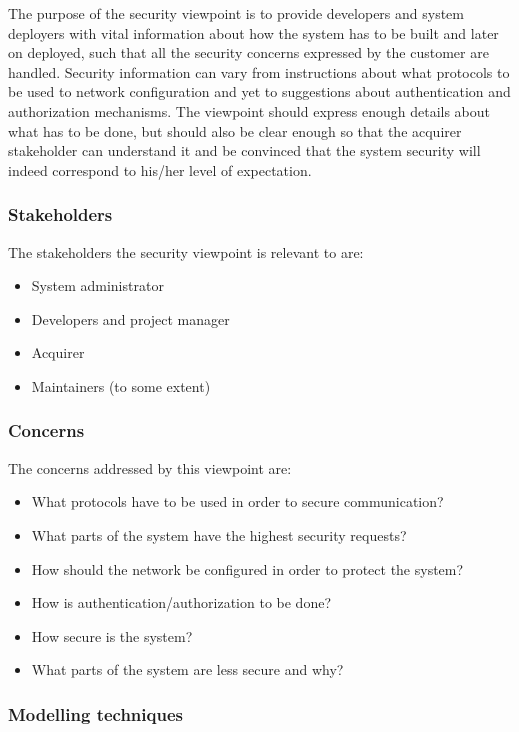 The purpose of the security viewpoint is to provide developers and system deployers with vital
information about how the system has to be built and later on deployed, such that all the
security concerns expressed by the customer are handled. Security information can vary from
instructions about what protocols to be used to network configuration and yet to suggestions
about authentication and authorization mechanisms. The viewpoint should express enough details
about what has to be done, but should also be clear enough so that the acquirer stakeholder can
understand it and be convinced that the system security will indeed correspond to his/her level of
expectation.

\subsubsection{Stakeholders}

The stakeholders the security viewpoint is relevant to are:

\begin{itemize}
\item System administrator
\item Developers and project manager
\item Acquirer
\item Maintainers (to some extent)
\end{itemize}

\subsubsection{Concerns}

The concerns addressed by this viewpoint are:

\begin{itemize}
\item What protocols have to be used in order to secure communication?
\item What parts of the system have the highest security requests?
\item How should the network be configured in order to protect the system?
\item How is authentication/authorization to be done?
\item How secure is the system?
\item What parts of the system are less secure and why?
\end{itemize}

\subsubsection{Modelling techniques}

